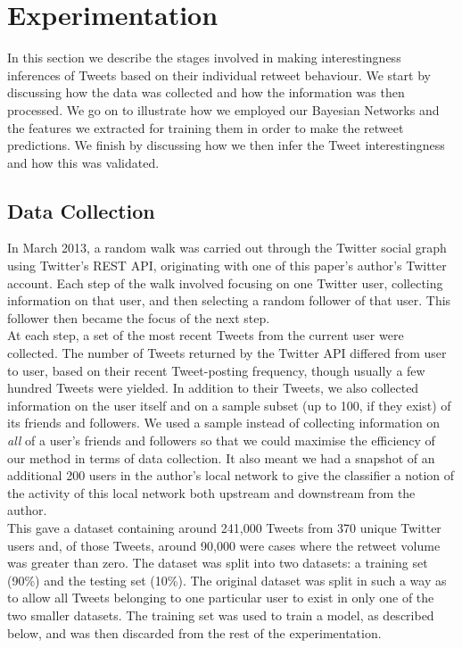 \section{Experimentation}
In this section we describe the stages involved in making interestingness inferences of Tweets based on their individual retweet behaviour. We start by discussing how the data was collected and how the information was then processed. We go on to illustrate how we employed our Bayesian Networks and the features we extracted for training them in order to make the retweet predictions. We finish by discussing how we then infer the Tweet interestingness and how this was validated.

\subsection{Data Collection}
In March 2013, a random walk was carried out through the Twitter social graph using Twitter's REST API, originating with one of this paper's author's Twitter account. Each step of the walk involved focusing on one Twitter user, collecting information on that user, and then selecting a random follower of that user. This follower then became the focus of the next step.\\
At each step, a set of the most recent Tweets from the current user were collected. The number of Tweets returned by the Twitter API differed from user to user, based on their recent Tweet-posting frequency, though usually a few hundred Tweets were yielded. In addition to their Tweets, we also collected information on the user itself and on a sample subset (up to 100, if they exist) of its friends and followers. We used a sample instead of collecting information on \textit{all} of a user's friends and followers so that we could maximise the efficiency of our method in terms of data collection. It also meant we had a snapshot of an additional 200 users in the author's local network to give the classifier a notion of the activity of this local network both upstream and downstream from the author.\\
This gave a dataset containing around 241,000 Tweets from 370 unique Twitter users and, of those Tweets, around 90,000 were cases where the retweet volume was greater than zero. The dataset was split into two datasets: a training set (90\%) and the testing set (10\%). The original dataset was split in such a way as to allow all Tweets belonging to one particular user to exist in only one of the two smaller datasets. The training set was used to train a model, as described below, and was then discarded from the rest of the experimentation.

